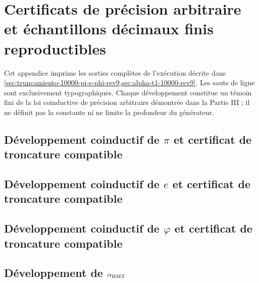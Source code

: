 \chapter{Certificats de précision arbitraire et échantillons décimaux finis reproductibles}
\label{app:desarrollos-10000-rev9}

Cet appendice imprime les sorties complètes de l'exécution décrite dans
\cref{sec:truncamiento-10000-pi-e-phi-rev9,sec:alpha-t1-10000-rev9}. Les
sauts de ligne sont exclusivement typographiques. Chaque développement constitue
un témoin fini de la loi coinductive de précision arbitraire démontrée dans
la Partie III ; il ne définit pas la constante ni ne limite la profondeur du générateur.

\begingroup
\lstset{basicstyle=\ttfamily\tiny,breaklines=true,breakatwhitespace=false,
  frame=single,columns=fullflexible,keepspaces=true,numbers=none}

\section{Développement coinductif de \(\pi\) et certificat de troncature compatible}


\section{Développement coinductif de \(e\) et certificat de troncature compatible}


\section{Développement coinductif de \(\varphi\) et certificat de troncature compatible}


\section{Développement de \texorpdfstring{\(\alpha_{\rm HMT}\)}{alpha HMT}}

\endgroup

